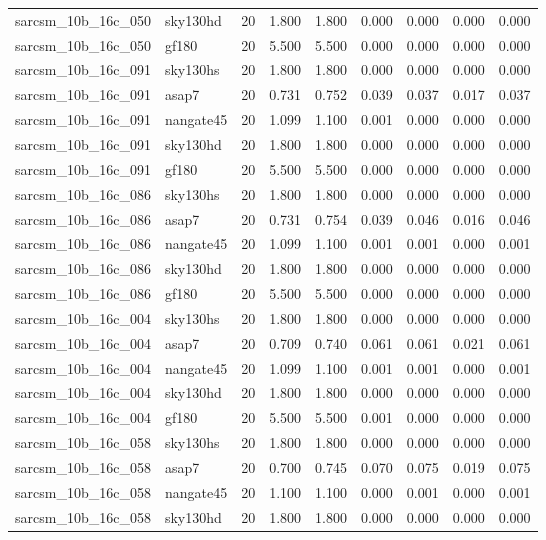 \begin{tabular}{llrrrrrrr}
sarcsm\_10b\_16c\_050 & sky130hd & 20 & 1.800 & 1.800 & 0.000 & 0.000 & 0.000 & 0.000 \\
sarcsm\_10b\_16c\_050 & gf180 & 20 & 5.500 & 5.500 & 0.000 & 0.000 & 0.000 & 0.000 \\
sarcsm\_10b\_16c\_091 & sky130hs & 20 & 1.800 & 1.800 & 0.000 & 0.000 & 0.000 & 0.000 \\
sarcsm\_10b\_16c\_091 & asap7 & 20 & 0.731 & 0.752 & 0.039 & 0.037 & 0.017 & 0.037 \\
sarcsm\_10b\_16c\_091 & nangate45 & 20 & 1.099 & 1.100 & 0.001 & 0.000 & 0.000 & 0.000 \\
sarcsm\_10b\_16c\_091 & sky130hd & 20 & 1.800 & 1.800 & 0.000 & 0.000 & 0.000 & 0.000 \\
sarcsm\_10b\_16c\_091 & gf180 & 20 & 5.500 & 5.500 & 0.000 & 0.000 & 0.000 & 0.000 \\
sarcsm\_10b\_16c\_086 & sky130hs & 20 & 1.800 & 1.800 & 0.000 & 0.000 & 0.000 & 0.000 \\
sarcsm\_10b\_16c\_086 & asap7 & 20 & 0.731 & 0.754 & 0.039 & 0.046 & 0.016 & 0.046 \\
sarcsm\_10b\_16c\_086 & nangate45 & 20 & 1.099 & 1.100 & 0.001 & 0.001 & 0.000 & 0.001 \\
sarcsm\_10b\_16c\_086 & sky130hd & 20 & 1.800 & 1.800 & 0.000 & 0.000 & 0.000 & 0.000 \\
sarcsm\_10b\_16c\_086 & gf180 & 20 & 5.500 & 5.500 & 0.000 & 0.000 & 0.000 & 0.000 \\
sarcsm\_10b\_16c\_004 & sky130hs & 20 & 1.800 & 1.800 & 0.000 & 0.000 & 0.000 & 0.000 \\
sarcsm\_10b\_16c\_004 & asap7 & 20 & 0.709 & 0.740 & 0.061 & 0.061 & 0.021 & 0.061 \\
sarcsm\_10b\_16c\_004 & nangate45 & 20 & 1.099 & 1.100 & 0.001 & 0.001 & 0.000 & 0.001 \\
sarcsm\_10b\_16c\_004 & sky130hd & 20 & 1.800 & 1.800 & 0.000 & 0.000 & 0.000 & 0.000 \\
sarcsm\_10b\_16c\_004 & gf180 & 20 & 5.500 & 5.500 & 0.001 & 0.000 & 0.000 & 0.000 \\
sarcsm\_10b\_16c\_058 & sky130hs & 20 & 1.800 & 1.800 & 0.000 & 0.000 & 0.000 & 0.000 \\
sarcsm\_10b\_16c\_058 & asap7 & 20 & 0.700 & 0.745 & 0.070 & 0.075 & 0.019 & 0.075 \\
sarcsm\_10b\_16c\_058 & nangate45 & 20 & 1.100 & 1.100 & 0.000 & 0.001 & 0.000 & 0.001 \\
sarcsm\_10b\_16c\_058 & sky130hd & 20 & 1.800 & 1.800 & 0.000 & 0.000 & 0.000 & 0.000 \\

\end{tabular}
